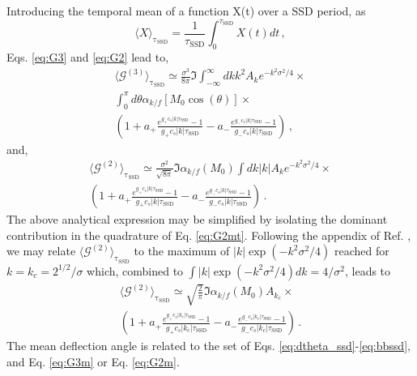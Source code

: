 \documentclass[%
 reprint,
 amsmath,amssymb,
 aps,
]{revtex4-1}
\begin{document}
Introducing the temporal mean of a function X(t) over a SSD period,  as
\begin{equation}\label{eq:avet}
    \langle X \rangle_\mathrm{\tau_ \mathrm{SSD}}= \frac{1}{\tau_\mathrm{SSD}} \int_0^{\tau_\mathrm{SSD}} X(t)dt \,,
\end{equation} 
Eqs. \eqref{eq:G3} and \eqref{eq:G2} lead to,
\begin{align}
\langle  \mathcal{G}^{(3)}\rangle_\mathrm{\tau_\mathrm{SSD}} \simeq\frac{\sigma^3}{8\pi} \Im \int_{-\infty}^\infty dk  k^2  A_{k}e^{-k^2\sigma^2/4} \times\nonumber\\
\int_0^\pi d\theta \alpha_{k/f}[M_0\cos(\theta)] \times\nonumber\\
\left( 1+a_+\frac{ e^{g_+c_s\vert k\vert \tau_\mathrm{SSD}}-1}{g_+c_s\vert k\vert \tau_\mathrm{SSD}}- a_-\frac{e^{g_-c_s \vert k \vert \tau_\mathrm{SSD}}-1}{g_-c_s \vert k \vert \tau_\mathrm{SSD}} \right) \, ,\label{eq:G3m}
\end{align}
and,  
\begin{align}
   \langle  \mathcal{G}^{(2)}\rangle_\mathrm{\tau_\mathrm{SSD}} \simeq \frac{\sigma^2}{\sqrt{8\pi}} \Im \alpha_{k/f}(M_0)  
 \int d k \vert k\vert  A_{k}e^{-k^2\sigma^2/4}\times \nonumber \\  \left( 1+a_+\frac{ e^{g_+c_s\vert k\vert \tau_\mathrm{SSD}}-1}{g_+c_s\vert k\vert \tau_\mathrm{SSD}}- a_-\frac{e^{g_-c_s \vert k \vert \tau_\mathrm{SSD}}-1}{g_-c_s \vert k \vert \tau_\mathrm{SSD}} \right) \, .\label{eq:G2mt} 
\end{align}
The above analytical expression  may be simplified by isolating the dominant contribution in the quadrature of Eq. \eqref{eq:G2mt}.
Following the appendix of Ref. \cite[]{POP_Ruyer_2020}, we  may relate $\langle  \mathcal{G}^{(2)}\rangle_\mathrm{\tau_\mathrm{SSD}}$ to
the maximum of  $\vert k \vert \exp(-k^2\sigma^2/4) $
  reached for $k=k_c=2^{1/2}/\sigma$ which, combined to $\int \vert k\vert \exp(-k^2\sigma^2/4) dk=4/\sigma^2$, leads to  
\begin{align}
   \langle  \mathcal{G}^{(2)}\rangle_\mathrm{\tau_\mathrm{SSD}} \simeq \sqrt{\frac{2}{\pi}} \Im \alpha_{k/f}(M_0)  
  A_{k_c}\times \nonumber \\ 
  \left( 1+a_+\frac{ e^{g_+c_s\vert k_c\vert \tau_\mathrm{SSD}}-1}{g_+c_s\vert k_c\vert \tau_\mathrm{SSD}}- a_-\frac{e^{g_-c_s \vert k_c \vert \tau_\mathrm{SSD}}-1}{g_-c_s \vert k_c \vert \tau_\mathrm{SSD}} \right) \, .\label{eq:G2m} 
\end{align}
The mean deflection angle is related to the set of Eqs. \eqref{eq:dtheta_ssd}-\eqref{eq:bbssd}, and Eq. \eqref{eq:G3m} or Eq. \eqref{eq:G2m}.
\end{document}
